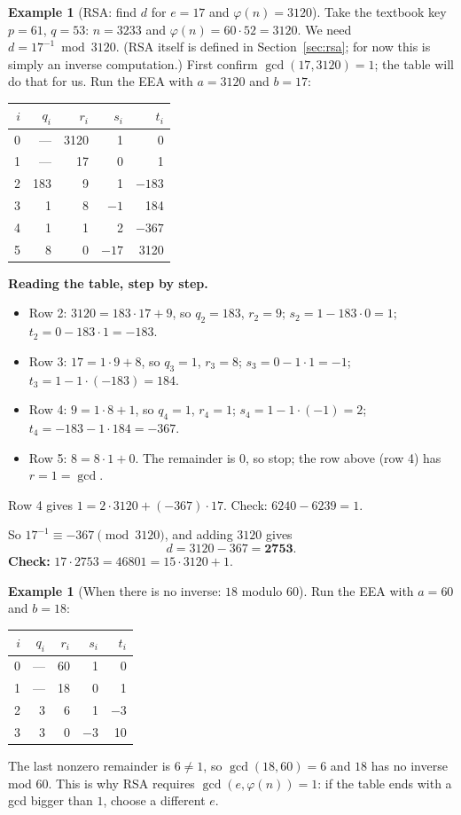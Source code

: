 \documentclass[11pt]{article}
\theoremstyle{definition}
\newtheorem{example}[theorem]{Example}
\theoremstyle{remark}
\newcommand{\hl}{\rowcolor{green!15}}   %
\begin{document}
\begin{example}[RSA: find $d$ for $e=17$ and $\varphi(n)=3120$]\label{ex:rsa-d}
Take the textbook key $p=61$, $q=53$: $n=3233$ and $\varphi(n)=60\cdot52=3120$. We need $d=17^{-1}\bmod 3120$. (RSA itself is defined in Section~\ref{sec:rsa}; for now this is simply an inverse computation.) First confirm $\gcd(17,3120)=1$; the table will do that for us. Run the EEA with $a=3120$ and $b=17$:
\begin{center}
\renewcommand{\arraystretch}{1.2}
\begin{tabular}{@{}rrrrr@{}}
\toprule
$i$ & $q_i$ & $r_i$ & $s_i$ & $t_i$ \\
\midrule
0 & --- & 3120 & 1 & 0 \\
1 & --- & 17 & 0 & 1 \\
2 & 183 & 9 & 1 & $-183$ \\
3 & 1 & 8 & $-1$ & 184 \\
\hl 4 & 1 & 1 & 2 & $-367$ \\
5 & 8 & 0 & $-17$ & 3120 \\
\bottomrule
\end{tabular}
\end{center}
\textbf{Reading the table, step by step.}
\begin{itemize}[nosep]
\item Row 2: $3120=183\cdot17+9$, so $q_2=183$, $r_2=9$; $s_2=1-183\cdot0=1$; $t_2=0-183\cdot1=-183$.
\item Row 3: $17=1\cdot9+8$, so $q_3=1$, $r_3=8$; $s_3=0-1\cdot1=-1$; $t_3=1-1\cdot(-183)=184$.
\item Row 4: $9=1\cdot8+1$, so $q_4=1$, $r_4=1$; $s_4=1-1\cdot(-1)=2$; $t_4=-183-1\cdot184=-367$.
\item Row 5: $8=8\cdot1+0$. The remainder is $0$, so stop; the row above (row 4) has $r=1=\gcd$.
\end{itemize}
Row 4 gives $1=2\cdot3120+(-367)\cdot17$. Check: $6240-6239=1$. \checkmark

So $17^{-1}\equiv-367\pmod{3120}$, and adding $3120$ gives
\[
d=3120-367=\mathbf{2753}.
\]
\textbf{Check:} $17\cdot2753=46801=15\cdot3120+1$. \checkmark
\end{example}

\begin{example}[When there is no inverse: $18$ modulo $60$]\label{ex:noinv}
Run the EEA with $a=60$ and $b=18$:
\begin{center}
\renewcommand{\arraystretch}{1.2}
\begin{tabular}{@{}rrrrr@{}}
\toprule
$i$ & $q_i$ & $r_i$ & $s_i$ & $t_i$ \\
\midrule
0 & --- & 60 & 1 & 0 \\
1 & --- & 18 & 0 & 1 \\
\hl 2 & 3 & 6 & 1 & $-3$ \\
3 & 3 & 0 & $-3$ & 10 \\
\bottomrule
\end{tabular}
\end{center}
The last nonzero remainder is $6\ne1$, so $\gcd(18,60)=6$ and $18$ has no inverse mod $60$. This is why RSA requires $\gcd(e,\varphi(n))=1$: if the table ends with a gcd bigger than $1$, choose a different $e$.
\end{example}
\end{document}

